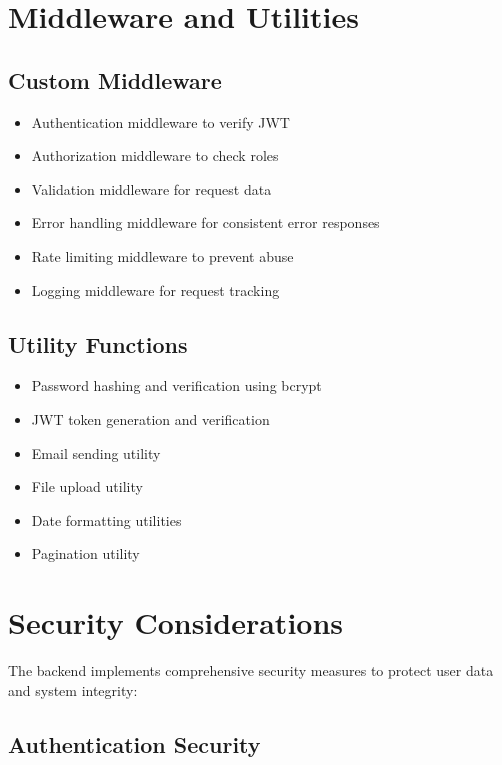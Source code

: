 \section{Middleware and Utilities}

\subsection{Custom Middleware}

\begin{itemize}
    \item Authentication middleware to verify JWT
    \item Authorization middleware to check roles
    \item Validation middleware for request data
    \item Error handling middleware for consistent error responses
    \item Rate limiting middleware to prevent abuse
    \item Logging middleware for request tracking
\end{itemize}

\subsection{Utility Functions}

\begin{itemize}
    \item Password hashing and verification using bcrypt
    \item JWT token generation and verification
    \item Email sending utility
    \item File upload utility
    \item Date formatting utilities
    \item Pagination utility
\end{itemize}

\section{Security Considerations}

The backend implements comprehensive security measures to protect user data and system integrity:

\subsection{Authentication Security}


